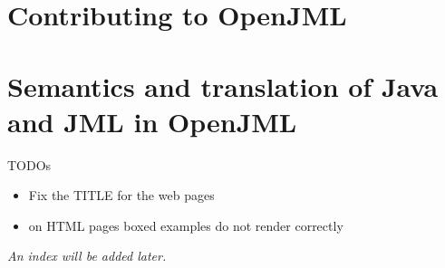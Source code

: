 \documentclass{report}%
\begin{document}






\part{Contributing to OpenJML}
\label{part:contributing}

\part{Semantics and translation of Java and JML in OpenJML}
\label{part:semantics}




\pagebreak

TODOs
\begin{itemize}
\item Fix the TITLE for the web pages
\item on HTML pages boxed examples do not render correctly
\end{itemize}

\textit{An index will be added later.} %


\end{document}
